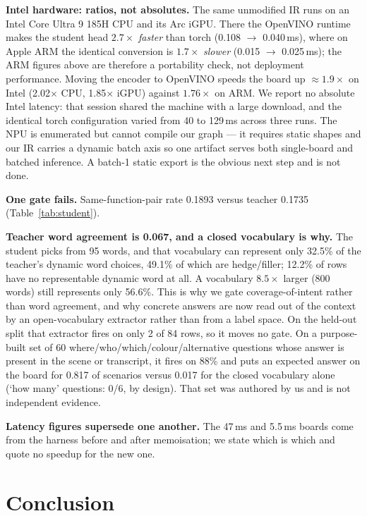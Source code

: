 \textbf{Intel hardware: ratios, not absolutes.} The same unmodified IR runs on
an Intel Core Ultra 9 185H CPU and its Arc iGPU. There the OpenVINO runtime makes
the student head $2.7\times$ \emph{faster} than torch (0.108 $\to$ 0.040\,ms),
where on Apple ARM the identical conversion is $1.7\times$ \emph{slower}
(0.015 $\to$ 0.025\,ms); the ARM figures above are therefore a portability check,
not deployment performance. Moving the encoder to OpenVINO speeds the board up
$\approx1.9\times$ on Intel (2.02$\times$ CPU, 1.85$\times$ iGPU) against
$1.76\times$ on ARM. We report no absolute Intel latency: that session shared the
machine with a large download, and the identical torch configuration varied from
40 to 129\,ms across three runs. The NPU is enumerated but cannot compile our
graph --- it requires static shapes and our IR carries a dynamic batch axis so one
artifact serves both single-board and batched inference. A batch-1 static export
is the obvious next step and is not done.

\textbf{One gate fails.} Same-function-pair rate 0.1893 versus teacher 0.1735
(Table~\ref{tab:student}).

\textbf{Teacher word agreement is 0.067, and a closed vocabulary is why.} The
student picks from 95 words, and that vocabulary can represent only 32.5\% of
the teacher's dynamic word choices, 49.1\% of which are hedge/filler; 12.2\% of
rows have no representable dynamic word at all. A vocabulary $8.5\times$ larger
(800 words) still represents only 56.6\%. This is why we gate coverage-of-intent
rather than word agreement, and why concrete answers are now read out of the
context by an open-vocabulary extractor rather than from a label space. On the
held-out split that extractor fires on only 2 of 84 rows, so it moves no gate.
On a purpose-built set of 60 where/who/which/colour/alternative questions whose
answer is present in the scene or transcript, it fires on 88\% and puts an
expected answer on the board for 0.817 of scenarios versus 0.017 for the closed
vocabulary alone (`how many' questions: 0/6, by design). That set was authored
by us and is not independent evidence.

\textbf{Latency figures supersede one another.} The 47\,ms and 5.5\,ms boards
come from the harness before and after memoisation; we state which is which and
quote no speedup for the new one.

\section{Conclusion}

